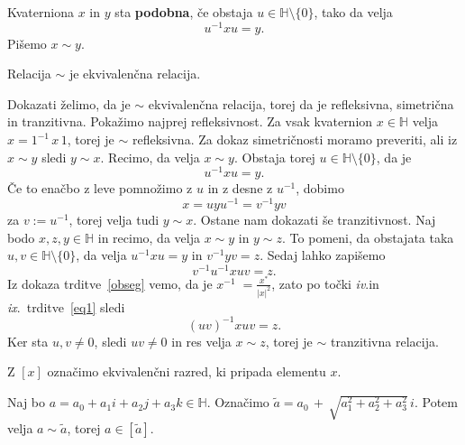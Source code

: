 \documentclass[mat1, tisk]{fmfdelo}
\numberwithin{equation}{section}
\begin{document}
\begin{definicija}
    Kvaterniona $x$ in $y$ sta \textbf{podobna}, če obstaja $u \in \mathbb{H}\setminus \{0\}$, tako da velja
    $$u^{-1}xu = y.$$
    Pišemo $x \sim y$.
\end{definicija}

\begin{trditev}
    Relacija $\sim$ je ekvivalenčna relacija. 
\end{trditev}

\begin{dokaz}
    Dokazati želimo, da je $\sim$ ekvivalenčna relacija, torej da je refleksivna, simetrična in tranzitivna. Pokažimo najprej refleksivnost. Za vsak kvaternion $x \in \mathbb{H}$ velja
    $x = 1^{-1}\, x \, 1$,
    torej je $\sim$ refleksivna. Za dokaz simetričnosti moramo preveriti, ali iz $x \sim y$ sledi $y \sim x$. Recimo, da velja $x \sim y$. Obstaja torej
    $u \in \mathbb{H}\setminus \{0\}$, da je 
    $$u^{-1}xu = y.$$ 
    Če to enačbo z leve pomnožimo z $u$ in z desne z $u^{-1}$, dobimo 
    $$x = uyu^{-1} = v^{-1}yv$$
    za $v := u^{-1}$, torej velja tudi $y \sim x$. Ostane 
    nam dokazati še tranzitivnost. Naj bodo $x, z, y \in \mathbb{H}$ in recimo, da velja $x \sim y$ in $y \sim z$. To pomeni, da obstajata taka $u, v \in \mathbb{H}\setminus \{0\}$,
    da velja 
    $u^{-1}xu = y$
    in
    $v^{-1}yv = z$.
    Sedaj lahko zapišemo
    $$v^{-1}u^{-1}xuv = z.$$
    Iz dokaza trditve~\ref{obseg} vemo, da je $x^{-1}\;=\displaystyle \frac{x^{*}}{|x|^2}$, zato po točki \textit{iv}.\@ in \textit{ix}.\ trditve~\ref{eq1} sledi
    $$(uv)^{-1}xuv = z.$$
    Ker sta $u, v \neq 0$, sledi $uv \neq 0$ in res velja $x \sim z$, torej je $\sim$ tranzitivna relacija.
\end{dokaz}

\begin{opomba}
    Z $\left[x\right]$ označimo ekvivalenčni razred, ki pripada elementu $x$.
\end{opomba}

\begin{lema}\label{ekvivalencni_razred}
    Naj bo $a = a_0 + a_1 i  +  a_2 j  +  a_3 k  \in \mathbb{H}$. Označimo $\tilde{a} = a_0 \, + \, \sqrt{a_1^2 + a_2^2 + a_3^2} \, i$. Potem velja $a \sim \tilde{a}$, 
    torej $a \in \left[\tilde{a}\right]$.
\end{lema}
\end{document}
